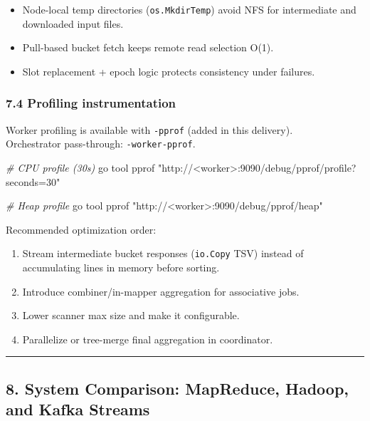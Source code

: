 \documentclass[
]{article}
\newenvironment{Shaded}{}{}
\newcommand{\CommentTok}[1]{\textcolor[rgb]{0.38,0.63,0.69}{\textit{#1}}}
\newcommand{\ExtensionTok}[1]{#1}
\newcommand{\NormalTok}[1]{#1}
\newcommand{\StringTok}[1]{\textcolor[rgb]{0.25,0.44,0.63}{#1}}
\providecommand{\tightlist}{%
  \setlength{\itemsep}{0pt}\setlength{\parskip}{0pt}}
\begin{document}
\begin{itemize}
\tightlist
\item
  Node-local temp directories (\texttt{os.MkdirTemp}) avoid NFS for
  intermediate and downloaded input files.
\item
  Pull-based bucket fetch keeps remote read selection O(1).
\item
  Slot replacement + epoch logic protects consistency under failures.
\end{itemize}

\subsubsection{7.4 Profiling
instrumentation}\label{profiling-instrumentation}

Worker profiling is available with \texttt{-pprof} (added in this
delivery).\\
Orchestrator pass-through: \texttt{-worker-pprof}.

\begin{Shaded}
\begin{Highlighting}[]
\CommentTok{\# CPU profile (30s)}
\ExtensionTok{go}\NormalTok{ tool pprof }\StringTok{"http://\textless{}worker\textgreater{}:9090/debug/pprof/profile?seconds=30"}

\CommentTok{\# Heap profile}
\ExtensionTok{go}\NormalTok{ tool pprof }\StringTok{"http://\textless{}worker\textgreater{}:9090/debug/pprof/heap"}
\end{Highlighting}
\end{Shaded}

Recommended optimization order:

\begin{enumerate}
\def\labelenumi{\arabic{enumi}.}
\tightlist
\item
  Stream intermediate bucket responses (\texttt{io.Copy} TSV) instead
  of accumulating lines in memory before sorting.
\item
  Introduce combiner/in-mapper aggregation for associative jobs.
\item
  Lower scanner max size and make it configurable.
\item
  Parallelize or tree-merge final aggregation in coordinator.
\end{enumerate}

\begin{center}\rule{0.5\linewidth}{0.5pt}\end{center}

\subsection{8. System Comparison: MapReduce, Hadoop, and Kafka
Streams}\label{kafka-streams-comparison-documentation}
\end{document}
